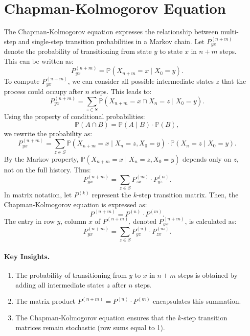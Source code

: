 \section{Chapman-Kolmogorov Equation}
The Chapman-Kolmogorov equation expresses the relationship between multi-step and single-step transition probabilities in a Markov chain. Let \( P^{(n+m)}_{yx} \) denote the probability of transitioning from state \( y \) to state \( x \) in \( n+m \) steps. This can be written as:
\[
P^{(n+m)}_{yx} = \mathbb{P}(X_{n+m} = x \mid X_0 = y).
\]
To compute \( P^{(n+m)}_{yx} \), we can consider all possible intermediate states \( z \) that the process could occupy after \( n \) steps. This leads to:
\[
P^{(n+m)}_{yx} = \sum_{z \in S} \mathbb{P}(X_{n+m} = x \cap X_n = z \mid X_0 = y).
\]
Using the property of conditional probabilities:
\[
\mathbb{P}(A \cap B) = \mathbb{P}(A \mid B) \cdot \mathbb{P}(B),
\]
we rewrite the probability as:
\[
P^{(n+m)}_{yx} = \sum_{z \in S} \mathbb{P}(X_{n+m} = x \mid X_n = z, X_0 = y) \cdot \mathbb{P}(X_n = z \mid X_0 = y).
\]
By the Markov property, \( \mathbb{P}(X_{n+m} = x \mid X_n = z, X_0 = y) \) depends only on \( z \), not on the full history. Thus:
\[
P^{(n+m)}_{yx} = \sum_{z \in S} P^{(m)}_{zx} \cdot P^{(n)}_{yz}.
\]
In matrix notation, let \( P^{(k)} \) represent the \( k \)-step transition matrix. Then, the Chapman-Kolmogorov equation is expressed as:
\[
P^{(n+m)} = P^{(n)} \cdot P^{(m)}.
\]
The entry in row \( y \), column \( x \) of \( P^{(n+m)} \), denoted \( P^{(n+m)}_{yx} \), is calculated as:
\[
P^{(n+m)}_{yx} = \sum_{z \in S} P^{(n)}_{yz} \cdot P^{(m)}_{zx}.
\]

\paragraph{Key Insights.}
\begin{enumerate}
    \item The probability of transitioning from \( y \) to \( x \) in \( n+m \) steps is obtained by adding all intermediate states \( z \) after \( n \) steps.
    \item The matrix product \( P^{(n+m)} = P^{(n)} \cdot P^{(m)} \) encapsulates this summation.
    \item The Chapman-Kolmogorov equation ensures that the \( k \)-step transition matrices remain stochastic (row sums equal to 1).
\end{enumerate}

